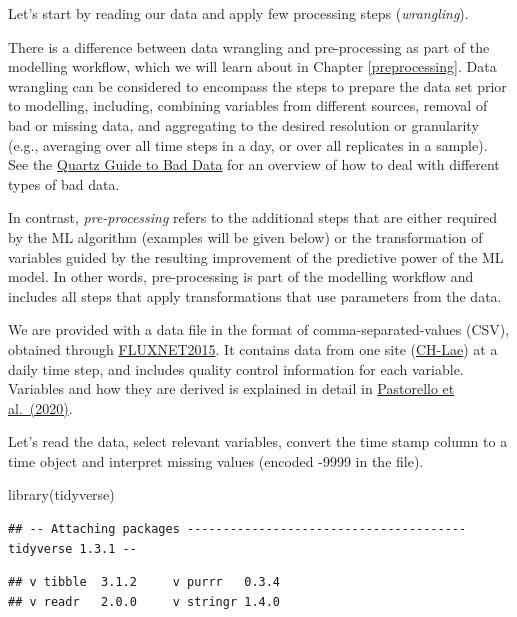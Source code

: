 \documentclass[
]{book}
\newenvironment{Shaded}{\begin{snugshade}}{\end{snugshade}}
\newcommand{\FunctionTok}[1]{\textcolor[rgb]{0.00,0.00,0.00}{#1}}
\newcommand{\NormalTok}[1]{#1}
\begin{document}
Let's start by reading our data and apply few processing steps (\emph{wrangling}).

There is a difference between data wrangling and pre-processing as part of the modelling workflow, which we will learn about in Chapter \ref{preprocessing}. Data wrangling can be considered to encompass the steps to prepare the data set prior to modelling, including, combining variables from different sources, removal of bad or missing data, and aggregating to the desired resolution or granularity (e.g., averaging over all time steps in a day, or over all replicates in a sample). See the \href{https://github.com/Quartz/bad-data-guide}{Quartz Guide to Bad Data} for an overview of how to deal with different types of bad data.

In contrast, \emph{pre-processing} refers to the additional steps that are either required by the ML algorithm (examples will be given below) or the transformation of variables guided by the resulting improvement of the predictive power of the ML model. In other words, pre-processing is part of the modelling workflow and includes all steps that apply transformations that use parameters from the data.

We are provided with a data file in the format of comma-separated-values (CSV), obtained through \href{https://fluxnet.org/data/fluxnet2015-dataset/}{FLUXNET2015}. It contains data from one site (\href{https://gl.ethz.ch/infrastructure/sites/laegeren.html}{CH-Lae}) at a daily time step, and includes quality control information for each variable. Variables and how they are derived is explained in detail in \href{https://www.nature.com/articles/s41597-020-0534-3}{Pastorello et al.~(2020)}.

Let's read the data, select relevant variables, convert the time stamp column to a time object and interpret missing values (encoded -9999 in the file).

\begin{Shaded}
\begin{Highlighting}[]
\FunctionTok{library}\NormalTok{(tidyverse)}
\end{Highlighting}
\end{Shaded}

\begin{verbatim}
## -- Attaching packages --------------------------------------- tidyverse 1.3.1 --
\end{verbatim}

\begin{verbatim}
## v tibble  3.1.2     v purrr   0.3.4
## v readr   2.0.0     v stringr 1.4.0
\end{verbatim}
\end{document}
